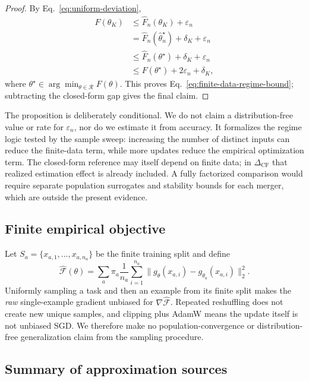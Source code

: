 \documentclass[letterpaper]{article} %
\theoremstyle{plain}
\theoremstyle{definition}
\begin{document}
\begin{proof}
By Eq.~\eqref{eq:uniform-deviation},
\begin{align*}
F(\theta_K)
&\le \widehat F_n(\theta_K)+\varepsilon_n \\
&=\widehat F_n(\widehat\theta_n^\star)+\delta_K+\varepsilon_n \\
&\le \widehat F_n(\theta^\star)+\delta_K+\varepsilon_n \\
&\le F(\theta^\star)+2\varepsilon_n+\delta_K,
\end{align*}
where $\theta^\star\in\arg\min_{\theta\in\mathcal R}F(\theta)$.
This proves Eq.~\eqref{eq:finite-data-regime-bound}; subtracting the closed-form gap gives the final claim.
\end{proof}

The proposition is deliberately conditional.
We do not claim a distribution-free value or rate for $\varepsilon_n$, nor do we estimate it from accuracy.
It formalizes the regime logic tested by the sample sweep: increasing the number of distinct inputs can reduce the finite-data term, while more updates reduce the empirical optimization term.
The closed-form reference may itself depend on finite data; in $\Delta_{\mathrm{CF}}$ that realized estimation effect is already included.
A fully factorized comparison would require separate population surrogates and stability bounds for each merger, which are outside the present evidence.

\subsection{Finite empirical objective}
\label{app:finite-data}

Let $S_a=\{x_{a,1},\ldots,x_{a,n_a}\}$ be the finite training split and define \[ \widehat{\mathcal F}(\theta) =\sum_a\pi_a\frac1{n_a}\sum_{i=1}^{n_a} \|g_\theta(x_{a,i})-g_{\theta_a}(x_{a,i})\|_2^2.
\] Uniformly sampling a task and then an example from its finite split makes the \emph{raw} single-example gradient unbiased for $\nabla\widehat{\mathcal F}$.
Repeated reshuffling does not create new unique samples, and clipping plus AdamW means the update itself is not unbiased SGD.
We therefore make no population-convergence or distribution-free generalization claim from the sampling procedure.

\subsection{Summary of approximation sources}
\label{app:theory-summary}
\end{document}
